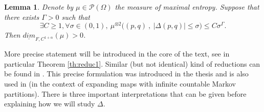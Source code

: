 \documentclass[a4paper]{article}
\newtheorem{lemma}[theorem]{Lemma}
\theoremstyle{definition}
\begin{document}
\begin{lemma}\label{lem:0}
Denote by $\mu \in \mathcal{P}(\Omega)$ the measure of maximal entropy.
Suppose that there exists $\Gamma>0$ such that
$$ \exists C \geq 1,  \forall \sigma \in (0,1), \ \mu^{\otimes 2}\big((p,q) \ , \ |\Delta(p,q)| \leq \sigma  \big) \leq C \sigma^\Gamma. $$
Then $\underline{dim}_{F,C^{1+\alpha}}(\mu)>0$.
\end{lemma}
More precise statement will be introduced in the core of the text, see in particular Theorem \ref{th:reduc1}. Similar (but not identical) kind of reductions can be found in \cite{BD17,LNP19,SS20,Le21,Le22,Le23b}. This precise formulation was introduced in the thesis \cite{Le24} and is also used in \cite{LPS25} (in the context of expanding maps with infinite countable Markov partitions). There is three important interpretations that can be given before explaining how we will study $\Delta$. 
\end{document}
